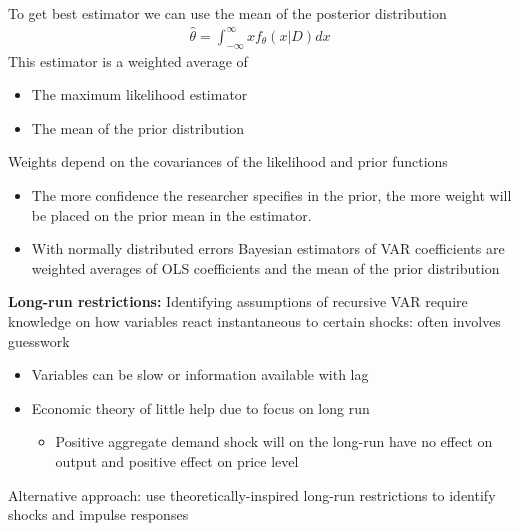 \documentclass{beamer}
\begin{document}
\begin{frame}
  To get best estimator we can use the mean of the posterior distribution  
\begin{align}
  \hat{\theta}= \int^\infty_{-\infty} xf_\theta(x | D)dx
\end{align}
This estimator is a weighted average of 
\begin{itemize}
  \item The maximum likelihood estimator
  \item The mean of the prior distribution
\end{itemize}
\medskip
 Weights depend on the covariances of the likelihood and prior functions
 \begin{itemize} 
   \item The more confidence the researcher specifies in the prior, the more weight will be placed on the prior mean in the estimator.
   \item With normally distributed errors Bayesian estimators of VAR coefficients are weighted averages of OLS coefficients and the mean of the prior distribution
 \end{itemize}
\end{frame}

\begin{frame}
  \textbf{Long-run restrictions:} Identifying assumptions of recursive VAR require knowledge on how variables react instantaneous to certain shocks: often involves guesswork
  \begin{itemize}
    \item Variables can be slow or information available with lag
    \item Economic theory of little help due to focus on long run
    \begin{itemize}
      \item Positive aggregate demand shock will on the long-run have no effect on output and positive effect on price level
    \end{itemize}
  \end{itemize}
  \medskip
  Alternative approach: use theoretically-inspired long-run restrictions to identify shocks and impulse responses
\end{frame}
\end{document}
